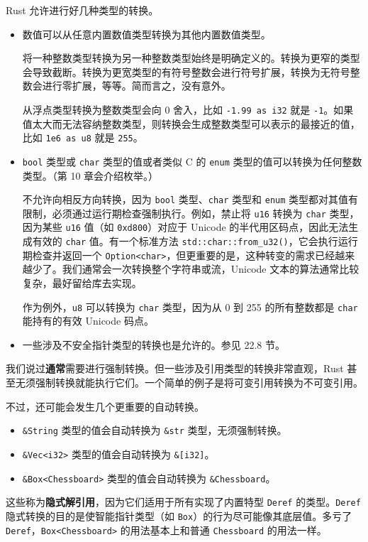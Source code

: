 Rust 允许进行好几种类型的转换。

\begin{itemize}
\item 数值可以从任意内置数值类型转换为其他内置数值类型。

将一种整数类型转换为另一种整数类型始终是明确定义的。转换为更窄的类型会导致截断。转换为更宽类型的有符号整数会进行符号扩展，转换为无符号整数会进行零扩展，等等。简而言之，没有意外。

从浮点类型转换为整数类型会向 0 舍入，比如 \texttt{-1.99 as i32} 就是 \texttt{-1}。如果值太大而无法容纳整数类型，则转换会生成整数类型可以表示的最接近的值，比如 \texttt{1e6 as u8} 就是 \texttt{255}。
\item \texttt{bool} 类型或 \texttt{char} 类型的值或者类似 C 的 \texttt{enum} 类型的值可以转换为任何整数类型。（第 10 章会介绍枚举。）

不允许向相反方向转换，因为 \texttt{bool} 类型、\texttt{char} 类型和 \texttt{enum} 类型都对其值有限制，必须通过运行期检查强制执行。例如，禁止将 \texttt{u16} 转换为 \texttt{char} 类型，因为某些 \texttt{u16} 值（如 \texttt{0xd800}）对应于 Unicode 的半代用区码点，因此无法生成有效的 \texttt{char} 值。有一个标准方法 \texttt{std::char::from\_u32()}，它会执行运行期检查并返回一个 \texttt{Option<char>}，但更重要的是，这种转变的需求已经越来越少了。我们通常会一次转换整个字符串或流，Unicode 文本的算法通常比较复杂，最好留给库去实现。

作为例外，\texttt{u8} 可以转换为 \texttt{char} 类型，因为从 0 到 255 的所有整数都是 \texttt{char} 能持有的有效 Unicode 码点。
\item 一些涉及不安全指针类型的转换也是允许的。参见 22.8 节。
\end{itemize}

我们说过\textbf{通常}需要进行强制转换。但一些涉及引用类型的转换非常直观，Rust 甚至无须强制转换就能执行它们。一个简单的例子是将可变引用转换为不可变引用。

不过，还可能会发生几个更重要的自动转换。

\begin{itemize}
\item \texttt{\&String} 类型的值会自动转换为 \texttt{\&str} 类型，无须强制转换。
\item \texttt{\&Vec<i32>} 类型的值会自动转换为 \texttt{\&[i32]}。
\item \texttt{\&Box<Chessboard>} 类型的值会自动转换为 \texttt{\&Chessboard}。
\end{itemize}

这些称为\textbf{隐式解引用}，因为它们适用于所有实现了内置特型 \texttt{Deref} 的类型。\texttt{Deref} 隐式转换的目的是使智能指针类型（如 \texttt{Box}）的行为尽可能像其底层值。多亏了 \texttt{Deref}，\texttt{Box<Chessboard>} 的用法基本上和普通 \texttt{Chessboard} 的用法一样。

